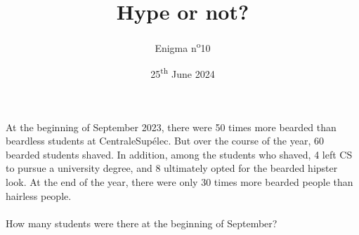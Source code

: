 \documentclass[a4paper, top=10mm]{article}
\title{\textbf{\huge{Hype or not?}}}
\author{Enigma n\textsuperscript{o}10}
\date{25\textsuperscript{th} June 2024}
\begin{document}
	\maketitle
	
	\Large
	At the beginning of September 2023, there were 50 times more bearded than beardless students at CentraleSupélec.
	But over the course of the year, 60 bearded students shaved.
	In addition, among the students who shaved, 4 left CS to pursue a university degree, and 8 ultimately opted for the bearded hipster look.
	At the end of the year, there were only 30 times more bearded people than hairless people.\\
	\\
	How many students were there at the beginning of September?
	
	\vspace{2cm}
	
	\begin{center}
	\end{center}
	
	
	
\end{document}
